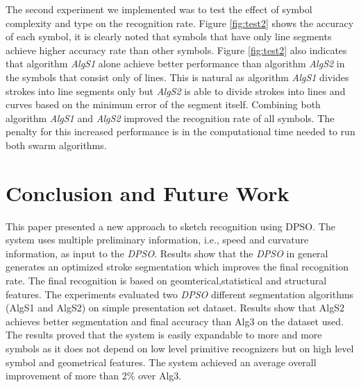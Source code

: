 \documentclass{article}
\begin{document}
The second experiment we implemented was to test the effect of symbol complexity and type on the recognition rate. Figure \ref{fig:test2} shows the accuracy of each symbol, it is clearly noted that symbols that have only line segments achieve higher accuracy rate than other symbols. Figure \ref{fig:test2} also indicates that algorithm \textsl{AlgS1} alone achieve better performance than algorithm  \textsl{AlgS2} in the symbols that consist only of lines. This is natural as algorithm \textsl{AlgS1} divides strokes into line segments only but \textsl{AlgS2} is able to divide strokes into lines and curves based on the minimum error of the segment itself. Combining both algorithm \textsl{AlgS1} and \textsl{AlgS2} improved the recognition rate of all symbols. The penalty for this increased performance is in the computational time needed to run both swarm algorithms. 
 
\section{Conclusion and Future Work}
\label{ConclusionandFutureWork}
This paper presented a new approach to sketch recognition using DPSO. The system uses multiple preliminary information, i.e., speed and curvature information, as input to the \textit{DPSO}. Results show that the \textit{DPSO} in general generates an optimized stroke segmentation which improves the final recognition rate.  The final recognition is based on geomterical,statistical and structural features. The experiments evaluated two \textit{DPSO} different segmentation algorithms (AlgS1 and AlgS2) on simple presentation set dataset. Results show that AlgS2 achieves better segmentation and final accuracy than Alg3 \cite{earlyprocess} on the dataset used. The results proved that the system is easily expandable to more and more symbols as it does not depend on low level primitive recognizers but on high level symbol and geometrical features.  The system achieved an average overall improvement of more than 2\% over Alg3.  
\end{document}
